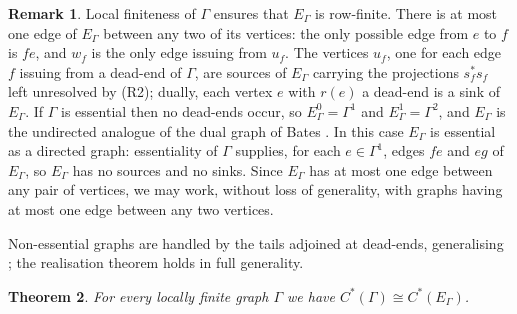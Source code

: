 \documentclass[12pt,reqno]{amsart}
\theoremstyle{plain}
\newtheorem{theorem}{Theorem}[section]
\theoremstyle{definition}
\newtheorem{remark}[theorem]{Remark}
\begin{document}
\begin{remark}\label{rem:EGamma}
Local finiteness of $\Gamma$ ensures that $E_\Gamma$ is row-finite. There is at most one edge of
$E_\Gamma$ between any two of its vertices: the only possible edge from $e$ to $f$ is $fe$, and
$w_f$ is the only edge issuing from $u_f$. The vertices $u_f$, one for
each edge $f$ issuing from a dead-end of $\Gamma$, are sources of $E_\Gamma$ carrying the
projections $s_f^*s_f$ left unresolved by (R2); dually, each vertex $e$ with $r(e)$ a dead-end is a
sink of $E_\Gamma$. If $\Gamma$ is essential then no dead-ends occur, so $E_\Gamma^0=\Gamma^1$ and
$E_\Gamma^1=\Gamma^2$, and $E_\Gamma$ is the undirected analogue of the dual graph of Bates
\cite[Theorem~3.1]{Bates}. In this case $E_\Gamma$ is
essential as a directed graph: essentiality of $\Gamma$ supplies, for each $e\in\Gamma^1$, edges
$fe$ and $eg$ of $E_\Gamma$, so $E_\Gamma$ has no sources and no sinks. Since $E_\Gamma$ has at
most one edge between any pair of vertices, we may work, without loss of generality, with graphs
having at most one edge between any two vertices.
\end{remark}

Non-essential graphs are handled by the tails adjoined at dead-ends, generalising \cite{BMPST}; the
realisation theorem holds in full generality.

\begin{theorem}\label{thm:general-realisation}
For every locally finite graph $\Gamma$ we have $C^*(\Gamma)\cong C^*(E_\Gamma)$.
\end{theorem}
\end{document}
